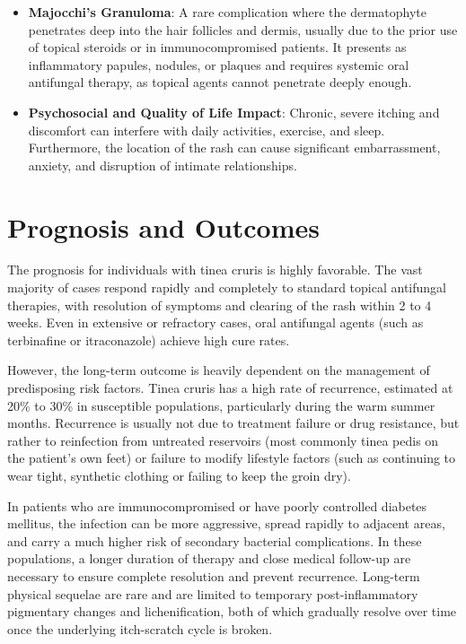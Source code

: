 \begin{itemize}
    \item \textbf{Majocchi's Granuloma}: A rare complication where the dermatophyte penetrates deep into the hair follicles and dermis, usually due to the prior use of topical steroids or in immunocompromised patients. It presents as inflammatory papules, nodules, or plaques and requires systemic oral antifungal therapy, as topical agents cannot penetrate deeply enough.
    \item \textbf{Psychosocial and Quality of Life Impact}: Chronic, severe itching and discomfort can interfere with daily activities, exercise, and sleep. Furthermore, the location of the rash can cause significant embarrassment, anxiety, and disruption of intimate relationships.
\end{itemize}

\section*{Prognosis and Outcomes}
The prognosis for individuals with tinea cruris is highly favorable. The vast majority of cases respond rapidly and completely to standard topical antifungal therapies, with resolution of symptoms and clearing of the rash within 2 to 4 weeks. Even in extensive or refractory cases, oral antifungal agents (such as terbinafine or itraconazole) achieve high cure rates.

However, the long-term outcome is heavily dependent on the management of predisposing risk factors. Tinea cruris has a high rate of recurrence, estimated at 20\% to 30\% in susceptible populations, particularly during the warm summer months. Recurrence is usually not due to treatment failure or drug resistance, but rather to reinfection from untreated reservoirs (most commonly tinea pedis on the patient's own feet) or failure to modify lifestyle factors (such as continuing to wear tight, synthetic clothing or failing to keep the groin dry).

In patients who are immunocompromised or have poorly controlled diabetes mellitus, the infection can be more aggressive, spread rapidly to adjacent areas, and carry a much higher risk of secondary bacterial complications. In these populations, a longer duration of therapy and close medical follow-up are necessary to ensure complete resolution and prevent recurrence. Long-term physical sequelae are rare and are limited to temporary post-inflammatory pigmentary changes and lichenification, both of which gradually resolve over time once the underlying itch-scratch cycle is broken.


